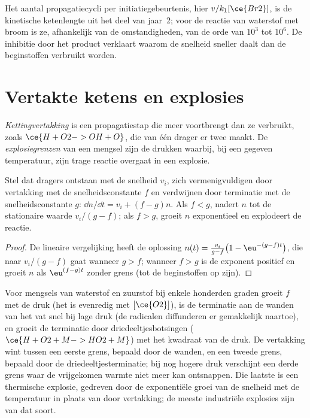 Het aantal propagatiecycli per initiatiegebeurtenis, hier $v/k_1[\ce{Br2}]$, is de
kinetische ketenlengte uit het deel van jaar~2; voor de reactie van
waterstof met broom is ze, afhankelijk van de omstandigheden, van de orde
van $10^3$ tot $10^6$. De inhibitie door het product verklaart waarom de
snelheid sneller daalt dan de beginstoffen verbruikt worden.

\section{Vertakte ketens en explosies}

\begin{definition}\label{def:b3:complex-kinetics:branching}
\emph{Kettingvertakking} is een propagatiestap
die meer  voortbrengt dan ze verbruikt, zoals $\ce{H + O2 -> OH + O}$, die van één
drager er twee maakt. De \emph{explosiegrenzen} van
een mengsel zijn de drukken waarbij, bij een gegeven temperatuur, zijn
trage reactie overgaat in een explosie.
\end{definition}

\begin{proposition}[Vertakkingscriterium]\label{prop:b3:complex-kinetics:branching}
Stel dat dragers ontstaan met de snelheid $v_i$, zich vermenigvuldigen door
vertakking met de snelheidsconstante $f$ en verdwijnen door terminatie met
de snelheidsconstante $g$:
$\dd n/\dd t = v_i + (f - g)n$. Als $f < g$, nadert $n$ tot de stationaire
waarde $v_i/(g - f)$; als
$f > g$, groeit $n$ exponentieel en explodeert de reactie.
\end{proposition}

\begin{proof}
De lineaire vergelijking heeft de oplossing $n(t) = \frac{v_i}{g - f}\bigl(1 - \eu^{-(g - f)t}\bigr)$, die
naar $v_i/(g - f)$ gaat wanneer $g > f$; wanneer $f > g$ is de exponent
positief en groeit $n$ als $\eu^{(f - g)t}$ zonder grens (tot de
beginstoffen op zijn).
\end{proof}

Voor mengsels van waterstof en zuurstof bij enkele honderden graden groeit
$f$ met de druk (het is evenredig met $[\ce{O2}]$), is de terminatie aan
de wanden van het vat snel bij lage druk (de radicalen diffunderen er
gemakkelijk naartoe), en groeit de terminatie door driedeeltjesbotsingen
($\ce{H + O2 + M -> HO2 + M}$) met het kwadraat van de druk. De vertakking
wint tussen een eerste grens, bepaald door de wanden, en een tweede grens,
bepaald door de driedeeltjesterminatie; bij nog hogere druk verschijnt een
derde grens waar de vrijgekomen warmte niet meer kan ontsnappen. Die
laatste is een thermische explosie, gedreven door de exponentiële groei
van de snelheid met de temperatuur in plaats van door vertakking; de
meeste industriële explosies zijn van dat soort.


